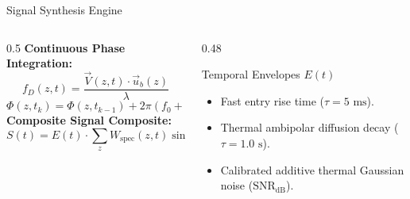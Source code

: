 \documentclass[aspectratio=169, 10pt]{beamer}
\begin{document}
\begin{frame}{Signal Synthesis Engine}
    \begin{columns}
        \begin{column}{0.5\textwidth}
            \textbf{Continuous Phase Integration:}
            \begin{equation*}
                f_D(z, t) = \frac{\vec{V}(z, t) \cdot \vec{u}_b(z)}{\lambda}
            \end{equation*}
            \begin{equation*}
                \Phi(z, t_k) = \Phi(z, t_{k-1}) + 2\pi (f_0 + f_D) dt
            \end{equation*}
            \vspace{0.1cm}
            \textbf{Composite Signal Composite:}
            \begin{equation*}
                S(t) = E(t) \cdot \sum_{z} W_{\mathrm{spec}}(z, t) \sin\left(\Phi(z, t)\right)
            \end{equation*}
        \end{column}
        \begin{column}{0.48\textwidth}
            \begin{block}{Temporal Envelopes $E(t)$}
                \begin{itemize}
                    \item Fast entry rise time ($\tau = 5\text{ ms}$).
                    \item Thermal ambipolar diffusion decay ($\tau = 1.0\text{ s}$).
                    \item Calibrated additive thermal Gaussian noise ($\text{SNR}_{\mathrm{dB}}$).
                \end{itemize}
            \end{block}
        \end{column}
    \end{columns}
\end{frame}
\end{document}
